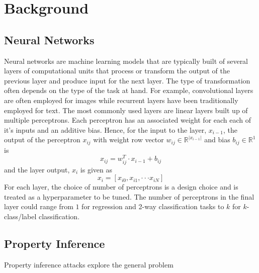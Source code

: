 \chapter{Background}
\section{Neural Networks}
Neural networks are machine learning models that are typically built of several layers of computational units that process or transform the output of the previous layer and produce input for the next layer. The type of transformation often depends on the type of the task at hand. For example, convolutional layers are often employed for images while recurrent layers have been traditionally employed for text. The most commonly used layers are linear layers built up of multiple perceptrons. Each perceptron has an associated weight for each each of it's inputs and an additive bias. Hence, for the input to the layer, $x_{i-1}$, the output of the perceptron $x_{ij}$ with weight row vector $w_{ij} \in \mathbb{R}^{|x_{i-1}|}$ and bias $b_{ij} \in \mathbb{R}^1$ is
$$
x_{ij} = w_{ij}^T \cdot x_{i-1} + b_{ij}
$$
and the layer output, $x_i$ is given as
$$
x_i = [x_{i0}, x_{i1}, \cdot \cdot \cdot x_{iN}]
$$
For each layer, the choice of number of perceptrons is a design choice and is treated as a hyperparameter to be tuned. The number of perceptrons in the final layer could range from $1$ for regression and 2-way classification tasks to $k$ for $k$-class/label classification.
\section{Property Inference}
Property inference attacks explore the general problem 